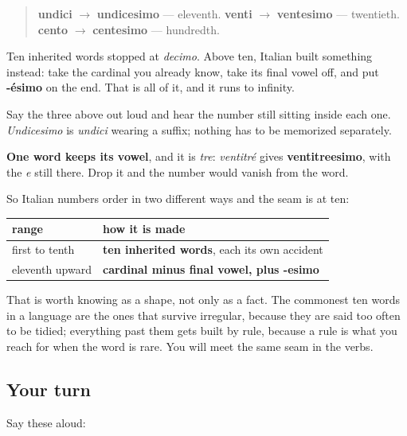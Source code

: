 \begin{grammarlens}[title={Grammar Lens: take the number, drop its last vowel, add -esimo}]
\begin{quote}
\textbf{undici} $\to$ \textbf{undicesimo} — eleventh. \textbf{venti} $\to$ \textbf{ventesimo} — twentieth. \textbf{cento} $\to$ \textbf{centesimo} — hundredth.
\end{quote}

Ten inherited words stopped at \emph{decimo}. Above ten, Italian built something instead: take the cardinal you already know, take its final vowel off, and put \textbf{-ésimo} on the end. That is all of it, and it runs to infinity.

Say the three above out loud and hear the number still sitting inside each one. \emph{Undicesimo} is \emph{undici} wearing a suffix; nothing has to be memorized separately.

\textbf{One word keeps its vowel}, and it is \emph{tre}: \emph{ventitré} gives \textbf{ventitreesimo}, with the \emph{e} still there. Drop it and the number would vanish from the word.
\end{grammarlens}

\begin{grammarlens}[title={What you've built: two systems, one number line}]
So Italian numbers order in two different ways and the seam is at ten:

\noindent
\begin{tabularx}{\linewidth}{@{}>{\raggedright\arraybackslash}X>{\raggedright\arraybackslash}X@{}}
\toprule
\textbf{range} & \textbf{how it is made} \\
\midrule
first to tenth & \textbf{ten inherited words}, each its own accident \\
eleventh upward & \textbf{cardinal minus final vowel, plus -esimo} \\
\bottomrule
\end{tabularx}

That is worth knowing as a shape, not only as a fact. The commonest ten words in a language are the ones that survive irregular, because they are said too often to be tidied; everything past them gets built by rule, because a rule is what you reach for when the word is rare. You will meet the same seam in the verbs.
\end{grammarlens}

\subsection*{Your turn}
Say these aloud:

